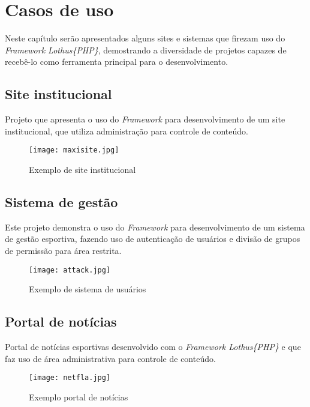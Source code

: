 \chapter{Casos de uso\label{cap:casos-de-uso}}
    Neste capítulo serão apresentados alguns sites e sistemas que firezam uso do \emph{Framework Lothus\{PHP\}}, demostrando a diversidade de projetos capazes de recebê-lo como ferramenta principal para o desenvolvimento.

    \section{Site institucional\label{sec:site-institucional}}

        Projeto que apresenta o uso do \emph{Framework} para desenvolvimento de um site institucional, que utiliza administração para controle de conteúdo.

        \begin{figure}[!htb]
            \centering
            \texttt{[image: maxisite.jpg]}
            \caption{\small Exemplo de site institucional}
            \label{cap:sass}
        \end{figure}


    \section{Sistema de gestão\label{sec:sistema}}

        Este projeto demonstra o uso do \emph{Framework} para desenvolvimento de um sistema de gestão esportiva, fazendo uso de autenticação de usuários e divisão de grupos de permissão para área restrita.

        \begin{figure}[!htb]
            \centering
            \texttt{[image: attack.jpg]}
            \caption{\small Exemplo de sistema de usuários}
            \label{cap:sass}
        \end{figure}


    \section{Portal de notícias\label{sec:portal}}

        Portal de notícias esportivas desenvolvido com o \emph{Framework Lothus\{PHP\}} e que faz uso de área administrativa para controle de conteúdo.

        \begin{figure}[!htb]
            \centering
            \texttt{[image: netfla.jpg]}
            \caption{\small Exemplo portal de notícias}
            \label{cap:sass}
        \end{figure}

